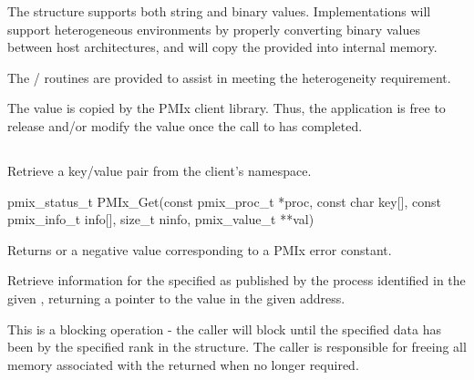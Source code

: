The  structure supports both string and binary values.
Implementations will support heterogeneous environments by properly converting binary values between host architectures, and will copy the provided  into internal memory.

\adviceimplstart
The / routines are provided to assist in meeting the heterogeneity requirement.
\adviceimplend

\adviceuserstart
The value is copied by the PMIx client library.
Thus, the application is free to release and/or modify the value once the call to  has completed.
\adviceuserend


\subsection{}

\summary

Retrieve a key/value pair from the client's namespace.

\format

\cspecificstart
\begin{codepar}
pmix_status_t
PMIx_Get(const pmix_proc_t *proc, const char key[],
         const pmix_info_t info[], size_t ninfo,
         pmix_value_t **val)
\end{codepar}
\cspecificend

\begin{arglist}
\end{arglist}

Returns  or a negative value corresponding to a PMIx error constant.

\descr

Retrieve information for the specified  as published by the process identified in the given , returning a pointer to the value in the given address.

This is a blocking operation - the caller will block until the specified data has been  by the specified rank in the  structure.
The caller is responsible for freeing all memory associated with the returned  when no longer required.

